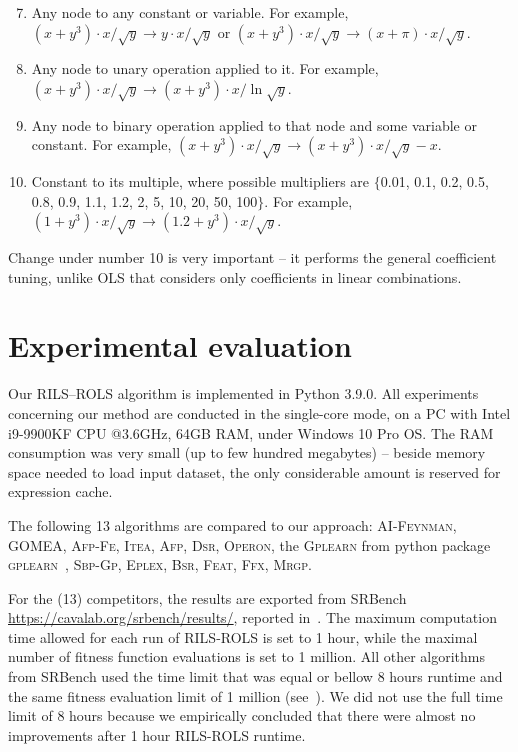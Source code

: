 \documentclass[a4paper,12pt]{elsarticle}
\begin{document}
\begin{enumerate}
	\setcounter{enumi}{6}
	\item Any node to any constant or variable. For example, $(x+y^3)\cdot x/\sqrt{y} \rightarrow y \cdot x / \sqrt{y}$ or  $(x+y^3)\cdot x/\sqrt{y} \rightarrow (x+\pi) \cdot x / \sqrt{y}$.
	\item Any node to unary operation applied to it. For example, $(x+y^3)\cdot x/\sqrt{y} \rightarrow (x+y^3)\cdot x/\ln{\sqrt{y}}$.
	\item Any node to binary operation applied to that node and some variable or constant. For example, $(x+y^3)\cdot x/\sqrt{y} \rightarrow (x+y^3)\cdot x/\sqrt{y} - x$.
	\item Constant to its multiple, where possible multipliers are $\{$0.01, 0.1, 0.2, 0.5, 0.8, 0.9, 1.1, 1.2, 2, 5, 10, 20, 50, 100$\}$. For example, $(1+y^3)\cdot x/\sqrt{y} \rightarrow (1.2+y^3)\cdot x/\sqrt{y}$.
\end{enumerate}

Change under number 10 is very important -- it performs the general coefficient tuning, unlike OLS that considers only coefficients in linear combinations.  

\section{Experimental evaluation}\label{sec:experiments}

Our \textsc{RILS}--\textsc{ROLS} algorithm is implemented in Python 3.9.0. All experiments concerning our method are conducted in the single-core mode, on a PC with Intel i9-9900KF CPU @3.6GHz, 64GB RAM, under Windows 10 Pro OS. The RAM consumption was very small (up to few hundred megabytes) -- beside memory space needed to load input dataset, the only considerable amount is reserved for expression cache. 


The following 13 algorithms are compared to our approach: \textsc{AI-Feynman}, \textsc{GOMEA}, \textsc{Afp-Fe}, \textsc{Itea}, \textsc{Afp}, \textsc{Dsr}, \textsc{Operon}, the \textsc{Gplearn} from python package \textsc{gplearn}~\cite{stephens2016genetic}, \textsc{Sbp-Gp}, \textsc{Eplex}, \textsc{Bsr}, \textsc{Feat}, \textsc{Ffx}, \textsc{Mrgp}. 

For the (13) competitors, the results are exported from SRBench \url{https://cavalab.org/srbench/results/}, reported in~\cite{la2021contemporary}. 
The maximum computation time allowed for each run of \textsc{RILS}-\textsc{ROLS} is set to 1 hour, while the maximal number of fitness function evaluations is set to 1 million. All other algorithms from SRBench used the time limit that was equal or bellow 8 hours runtime and the same fitness evaluation limit of 1 million (see~\cite{la2021contemporary}). We did not use the full time limit of 8 hours because we empirically concluded that there were almost no improvements after 1 hour \textsc{RILS}-\textsc{ROLS} runtime.
\end{document}
